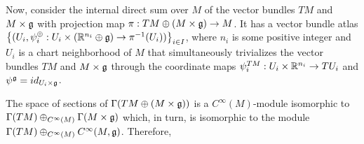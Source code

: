 Now, consider the internal direct sum over $M$ of the vector bundles $TM$ and $M \times \mathfrak{g}$ with projection map $\pi: TM \oplus (M \times \mathfrak{g}) \to M$. %
It has a vector bundle atlas $\left\{ (U_i, \psi^\oplus_i: U_i \times (\mathbb{R}^{n_i} \oplus \mathfrak{g}) \to \pi^{-1}(U_i) ) \right\}_{i \in I}$, where $n_i$ is some positive integer and $U_i$ is a chart neighborhood of $M$ that simultaneously trivializes the vector bundles $TM$ and $M \times \mathfrak{g}$ through the coordinate maps $\psi^{TM}_i: U_i \times \mathbb{R}^{n_i} \to TU_i$  and $\psi^{\mathfrak{g}} = id_{U_i \times \mathfrak{g}}$.

The space of sections of $\Gamma(TM \oplus (M \times \mathfrak{g}))$ is a $C^\infty(M)$-module isomorphic to $\Gamma(TM) \oplus_{C^\infty(M)}\Gamma(M \times \mathfrak{g})$ which, in turn, is isomorphic to the module $\Gamma(TM) \oplus_{C^\infty(M)} C^\infty(M, \mathfrak{g})$. Therefore, 

